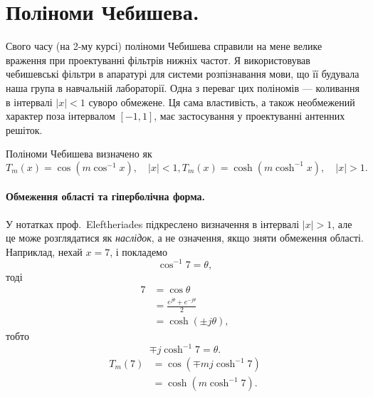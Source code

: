 %
%
\section{Поліноми Чебишева.}
Свого часу (на 2-му курсі) поліноми Чебишева справили на мене велике враження при проектуванні фільтрів нижніх частот. Я використовував чебишевські фільтри в апаратурі для системи розпізнавання мови, що її будувала наша група в навчальній лабораторії. Одна з переваг цих поліномів — коливання в інтервалі \(|x| < 1\) суворо обмежене. Ця сама властивість, а також необмежений характер поза інтервалом \([-1,1]\), має застосування у проектуванні антенних решіток.

Поліноми Чебишева визначено як
\begin{subequations}
\label{eqn:chebyscheff:20}
\begin{equation}\label{eqn:chebyscheff:40}
T_m(x) = \cos(m \cos^{-1} x), \quad |x| < 1,
\end{equation}
\begin{equation}\label{eqn:chebyscheff:60}
T_m(x) = \cosh(m \cosh^{-1} x), \quad |x| > 1.
\end{equation}
\end{subequations}

\paragraph{Обмеження області та гіперболічна форма.}
У нотатках проф.~Eleftheriades підкреслено визначення в інтервалі \(|x| > 1\), але це може розглядатися як \emph{наслідок}, а не означення, якщо зняти обмеження області. Наприклад, нехай \(x = 7\), і покладемо
\begin{equation}\label{eqn:chebyscheff:160}
\cos^{-1} 7 = \theta,
\end{equation}
тоді
\begin{equation}\label{eqn:chebyscheff:180}
\begin{aligned}
7
&= \cos\theta
\\ &= \frac{e^{j\theta} + e^{-j\theta}}{2}
\\ &= \cosh(\pm j\theta),
\end{aligned}
\end{equation}
тобто
\begin{equation}\label{eqn:chebyscheff:200}
\mp j \cosh^{-1} 7 = \theta.
\end{equation}
\begin{equation}\label{eqn:chebyscheff:220}
\begin{aligned}
T_m(7)
&= \cos(\mp m j \cosh^{-1} 7)
\\ &= \cosh(m \cosh^{-1} 7).
\end{aligned}
\end{equation}

